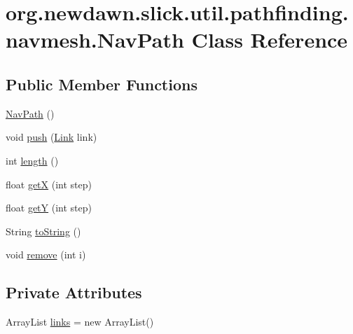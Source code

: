 \hypertarget{classorg_1_1newdawn_1_1slick_1_1util_1_1pathfinding_1_1navmesh_1_1_nav_path}{}\section{org.\+newdawn.\+slick.\+util.\+pathfinding.\+navmesh.\+Nav\+Path Class Reference}
\label{classorg_1_1newdawn_1_1slick_1_1util_1_1pathfinding_1_1navmesh_1_1_nav_path}
\subsection*{Public Member Functions}
\begin{DoxyCompactItemize}
\item 
\mbox{\hyperlink{classorg_1_1newdawn_1_1slick_1_1util_1_1pathfinding_1_1navmesh_1_1_nav_path_ae66c827176e3d64a7b9bfddc289666da}{Nav\+Path}} ()
\item 
void \mbox{\hyperlink{classorg_1_1newdawn_1_1slick_1_1util_1_1pathfinding_1_1navmesh_1_1_nav_path_adc600d773ef90ccfa1f694a4360de4ce}{push}} (\mbox{\hyperlink{classorg_1_1newdawn_1_1slick_1_1util_1_1pathfinding_1_1navmesh_1_1_link}{Link}} link)
\item 
int \mbox{\hyperlink{classorg_1_1newdawn_1_1slick_1_1util_1_1pathfinding_1_1navmesh_1_1_nav_path_a57379bacf5476fb52e7f42d4565f37ac}{length}} ()
\item 
float \mbox{\hyperlink{classorg_1_1newdawn_1_1slick_1_1util_1_1pathfinding_1_1navmesh_1_1_nav_path_a7272c9ccd8f6bb478be3a4451e9d029f}{getX}} (int step)
\item 
float \mbox{\hyperlink{classorg_1_1newdawn_1_1slick_1_1util_1_1pathfinding_1_1navmesh_1_1_nav_path_a9070ea91900af3a0ba8a76b6a6067a08}{getY}} (int step)
\item 
String \mbox{\hyperlink{classorg_1_1newdawn_1_1slick_1_1util_1_1pathfinding_1_1navmesh_1_1_nav_path_a77930ab81227498f028e0dd3c67be8c2}{to\+String}} ()
\item 
void \mbox{\hyperlink{classorg_1_1newdawn_1_1slick_1_1util_1_1pathfinding_1_1navmesh_1_1_nav_path_a9c30f810bc9b2eba2b244a34f26d1f88}{remove}} (int i)
\end{DoxyCompactItemize}
\subsection*{Private Attributes}
\begin{DoxyCompactItemize}
\item 
Array\+List \mbox{\hyperlink{classorg_1_1newdawn_1_1slick_1_1util_1_1pathfinding_1_1navmesh_1_1_nav_path_aa79523223a18486178fbb21fe550f253}{links}} = new Array\+List()
\end{DoxyCompactItemize}


